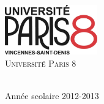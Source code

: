 \begin{titlepage}
\begin{center}
\vfill

\begin{minipage}[t]{0.48\textwidth}
  \begin{center}
    \includegraphics [width=40mm]{images/logo-paris8.jpg} \\[0.5cm]
    \textsc{\large Université Paris 8}
  \end{center}
\end{minipage} \\[1.5cm]

{\large Année scolaire 2012-2013}

\end{center}

\end{titlepage}
